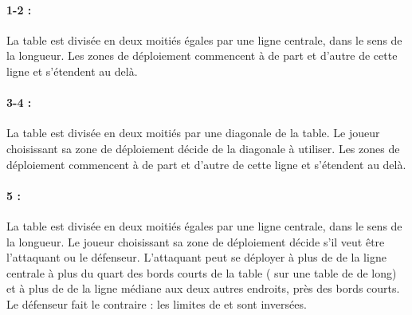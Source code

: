 \hypertarget{frontlineclash}{\paragraph{1-2 : \frontlineclash{}}}
\label{figure/deployment}
\begin{minipage}[c]{0.35\textwidth}
\def\svgwidth{\textwidth}

\end{minipage}\hfill
\begin{minipage}[c]{0.62\textwidth}
La table est divisée en deux moitiés égales par une ligne centrale, dans le sens de la longueur. Les zones de déploiement commencent à  de part et d'autre de cette ligne et s'étendent au delà. 
\end{minipage}

\hypertarget{refusedflank}{\paragraph{3-4 : }}

\begin{minipage}[c]{0.35\textwidth}
\def\svgwidth{\textwidth}

\end{minipage}\hfill
\begin{minipage}[c]{0.62\textwidth}
La table est divisée en deux moitiés par une diagonale de la table. Le joueur choisissant sa zone de déploiement décide de la diagonale à utiliser. Les zones de déploiement commencent à  de part et d'autre de cette ligne et s'étendent au delà.
\end{minipage}

\hypertarget{encircle}{\paragraph{5 : \encircle{}}}

\newcommand{\deploymentfigAttacker}{\flufffont{Attaquant}}
\newcommand{\deploymentfigDefender}{\flufffont{Défenseur}}
\begin{minipage}[c]{0.35\textwidth}
\def\svgwidth{\textwidth}

\end{minipage}\hfill
\begin{minipage}[c]{0.62\textwidth}
La table est divisée en deux moitiés égales par une ligne centrale, dans le sens de la longueur. Le joueur choisissant sa zone de déploiement décide s'il veut être l'attaquant ou le défenseur. L'attaquant peut se déployer à plus de  de la ligne centrale à plus du quart des bords courts de la table ( sur une table de  de long) et à plus de  de la ligne médiane aux deux autres endroits, près des bords courts. Le défenseur fait le contraire : les limites de  et  sont inversées.
\end{minipage}

